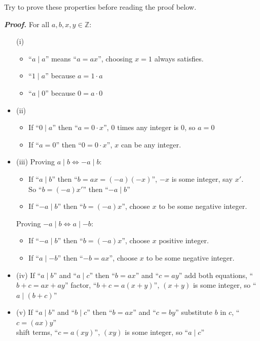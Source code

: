 \noindent
Try to prove these properties before reading the proof below.
\noindent
\begin{Proof}[Theorem 1.1]
    \textit{\textbf{Proof.}} For all $a, b, x,y \in \mathbb{Z}$:
    \begin{itemize}
        \item[(i)]  \begin {itemize}
        \item ``$a\mid a$'' means ``$a = ax$'', choosing $x = 1$ always satisfies.
        \item ``$1\mid a$'' because $a = 1\cdot a$
        \item ``$a\mid 0$'' because $0 = a\cdot 0$
    \end{itemize}
    \item[(ii)] \begin {itemize}
    \item If ``$0\mid a$'' then ``$a = 0\cdot x$'', 0 times any integer is 0, so $a = 0$
    \item If ``$a = 0$'' then ``$0 = 0\cdot x$'', $x$ can be any integer.
    \end {itemize}

    \noindent
    \item[(iii)]
    Proving $a\mid b \Longleftrightarrow -a\mid b$:
    \begin{itemize}
        \item If ``$a\mid b$'' then ``$b = ax = (-a)(-x)$'', $-x$ is some integer, say $x'$.\\
              So ``$b = (-a)x'$'' then ``$-a\mid b$''
        \item If ``$-a\mid b$'' then ``$b = (-a)x$'', choose $x$ to be some negative integer.\\
    \end{itemize}
    \vspace{-1em}
    Proving $-a\mid b \Longleftrightarrow a\mid -b$:
    \begin{itemize}
        \item If ``$-a\mid b$'' then ``$b = (-a)x$'', choose $x$ positive integer.
        \item If ``$a\mid -b$'' then ``$-b = ax$'', choose $x$ to be some negative integer.
    \end{itemize}
    \item[(iv)] If ``$a\mid b$'' and ``$a\mid c$'' then ``$b = ax$'' and ``$c = ay$'' add both equations, ``$b+c = ax+ay$''
    factor, ``$b+c = a(x+y)$'', $(x+y)$ is some integer, so ``$a\mid (b+c)$''

    \item[(v)] If ``$a\mid b$'' and ``$b\mid c$'' then ``$b = ax$'' and ``$c = by$'' substitute $b$ in $c$, ``$c = (ax)y$''\\
    shift terms, ``$c = a(xy)$'', $(xy)$ is some integer, so ``$a\mid c$''
    \end{itemize}

\end{Proof}

